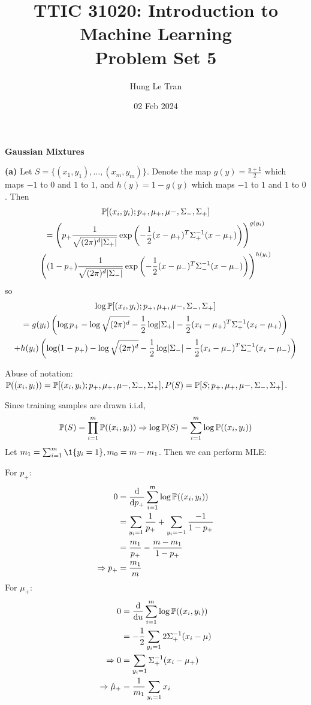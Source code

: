 \documentclass[a4paper, 11pt]{article}
\title{TTIC 31020: Introduction to Machine Learning \\ \large Problem Set 5}
\date{02 Feb 2024}
\author{Hung Le Tran}
\begin{document}
\maketitle
\setcounter{section}{5}
\textbf{\Large{Gaussian Mixtures}}
\begin{problem}

\textbf{(a)} Let $S = \{(x_1, y_1), \ldots, (x_m, y_m)\}$. Denote the map $g(y) = \frac{y + 1}{2}$ which maps $-1$ to $0$ and $1$ to $1$, and $h(y) = 1 - g(y)$ which maps $-1$ to $1$ and $1$ to $0$. Then 
\begin{multline*}
    \mathbb{P}[(x_i, y_i); p_+, \mu_+, \mu-, \Sigma_-, \Sigma_+] \\= \left(p_+ \frac{1}{\sqrt{(2\pi)^d \lvert\Sigma_+\rvert}}\exp\left({-\frac{1}{2} (x - \mu_+)^T \Sigma_+^{-1} (x - \mu_+)}\right)\right)^{g(y_i)} \\
     \left((1 - p_+) \frac{1}{\sqrt{(2\pi)^d \lvert\Sigma_-\rvert}}\exp\left(-\frac{1}{2} (x - \mu_-)^T \Sigma_-^{-1} (x - \mu_-)\right)\right)^{h(y_i)}  
\end{multline*}
so \begin{multline*}
    \log \mathbb{P}[(x_i, y_i); p_+, \mu_+, \mu-, \Sigma_-, \Sigma_+] \\= g(y_i) \left(\log p_+ - \log \sqrt{(2\pi)^d} - \frac{1}{2} \log \lvert\Sigma_+\rvert - \frac{1}{2} (x_i - \mu_+)^T \Sigma^{-1}_+ (x_i - \mu_+) \right) \\ 
    +  h(y_i) \left(\log (1 - p_+) - \log \sqrt{(2\pi)^d} - \frac{1}{2} \log \lvert\Sigma_-\rvert - \frac{1}{2} (x_i - \mu_-)^T \Sigma^{-1}_- (x_i - \mu_-) \right)
\end{multline*}

Abuse of notation: $\mathbb{P}((x_i, y_i)) = \mathbb{P}[(x_i, y_i); p_+, \mu_+, \mu-, \Sigma_-, \Sigma_+], P(S) =\mathbb{P}[S; p_+, \mu_+, \mu-, \Sigma_-, \Sigma_+] $.

Since training samples are drawn i.i.d, \begin{equation*}
\mathbb{P} (S) = \prod_{i=1}^{m} \mathbb{P}((x_i, y_i)) \Rightarrow \log \mathbb{P}(S) = \sum_{i=1}^{m} \log \mathbb{P}((x_i, y_i))
\end{equation*}
Let $m_1 = \sum_{i=1}^{m} \1\{y_i = 1\}, m_0 = m - m_1$. Then we can perform MLE:

For $p_+$:
\begin{align*}
    0 &= \frac{\mathrm{d}}{\mathrm{d} p_+} \sum_{i=1}^{m} \log \mathbb{P} ((x_i, y_i)) \\
    &=  \sum_{y_i = 1} \frac{1}{p_+} + \sum_{y_i = -1} \frac{-1}{1 - p_+} \\
    &= \frac{m_1}{p_+} - \frac{m - m_1}{1 - p_+} \\
    \Rightarrow p_+ &= \frac{m_1}{m}
\end{align*}
For $\mu_+$:
\begin{align*}
    0 &= \frac{\mathrm{d}}{\mathrm{d} u} \sum_{i=1}^{m} \log \mathbb{P}((x_i, y_i)) \\
    &= - \frac{1}{2} \sum_{y_i = 1} 2 \Sigma_+^{-1}(x_i - \mu) \\
    \Rightarrow 0&= \sum_{y_i = 1} \Sigma_+^{-1}(x_i - \mu_+) \\
    \Rightarrow \hat{\mu}_+ &= \frac{1}{m_1} \sum_{y_i = 1} x_i
\end{align*}


\end{problem}
\end{document}
